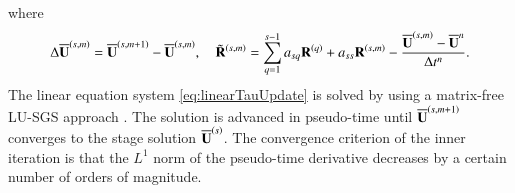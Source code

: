 {where
\begin{equation}
    \label{eq:define-inc}
    \mathrm\Delta \overline{\mathbf{U}}^{\left(s,m\right)}= 
    \overline{\mathbf{U}}^{\left(s,m+1\right)} - \overline{\mathbf{U}}^{\left(s,m\right)}, \quad 
    \tilde{\mathbf{R}}^{\left(s,m\right)}= 
    \sum_{q=1}^{s-1} a_{sq} \mathbf{R}^{\left(q\right)} + 
    a_{ss} \mathbf{R}^{\left(s,m\right)} - 
    \dfrac{\overline{\mathbf{U}}^{\left(s,m\right)} - \overline{\mathbf{U}}^{n}}{\mathrm\Delta t^n}.
\end{equation}
The linear equation system \eqref{eq:linearTauUpdate} is solved by using a matrix-free LU-SGS approach \cite{luo1998fast}. The solution is advanced in pseudo-time until $\overline{\mathbf{U}}^{\left(s,m+1\right)}$ converges to the stage solution $\overline{\mathbf{U}}^{\left(s\right)}$. The convergence criterion of the inner iteration is that the $L^1$ norm of the pseudo-time derivative decreases by a certain number of orders of magnitude.
}
